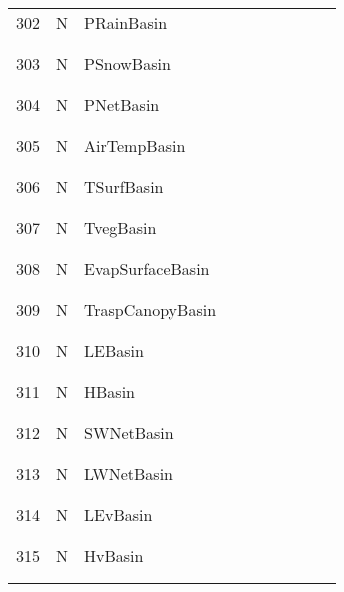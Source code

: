 \begin{longtable}{|c|c|l|c|c|c|c|p{}|c|p{}|}
302 & N & PRainBasin & & & & & & & \\
&&&&&&&&&\\\hline%
&&&&&&&&&\\
303 & N & PSnowBasin & & & & & & & \\
&&&&&&&&&\\\hline%
&&&&&&&&&\\
304 & N & PNetBasin & & & & & & & \\
&&&&&&&&&\\\hline%
&&&&&&&&&\\
305 & N & AirTempBasin & & & & & & & \\
&&&&&&&&&\\\hline%
&&&&&&&&&\\
306 & N & TSurfBasin & & & & & & & \\
&&&&&&&&&\\\hline%
&&&&&&&&&\\
307 & N & TvegBasin & & & & & & & \\
&&&&&&&&&\\\hline%
&&&&&&&&&\\
308 & N & EvapSurfaceBasin & & & & & & & \\
&&&&&&&&&\\\hline%
&&&&&&&&&\\
309 & N & TraspCanopyBasin & & & & & & & \\
&&&&&&&&&\\\hline%
&&&&&&&&&\\
310 & N & LEBasin & & & & & & & \\
&&&&&&&&&\\\hline%
&&&&&&&&&\\
311 & N & HBasin & & & & & & & \\
&&&&&&&&&\\\hline%
&&&&&&&&&\\
312 & N & SWNetBasin & & & & & & & \\
&&&&&&&&&\\\hline%
&&&&&&&&&\\
313 & N & LWNetBasin & & & & & & & \\
&&&&&&&&&\\\hline%
&&&&&&&&&\\
314 & N & LEvBasin & & & & & & & \\
&&&&&&&&&\\\hline%
&&&&&&&&&\\
315 & N & HvBasin & & & & & & & \\
&&&&&&&&&\\\hline%
&&&&&&&&&\\

\end{longtable}
